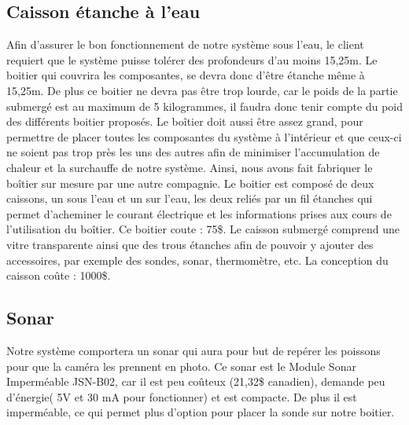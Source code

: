 	\subsection{Caisson étanche à l'eau}
	Afin d’assurer le bon fonctionnement de notre système sous l’eau, le client requiert que le système puisse tolérer des profondeurs d’au moins 15,25m. Le boitier qui couvrira les composantes, se devra donc d’être étanche même à 15,25m. De plus ce boitier ne devra pas être trop lourde, car le poids de la partie submergé est au maximum de 5 kilogrammes, il faudra donc tenir compte du poid des différents boitier proposés. Le boîtier doit aussi être assez grand, pour permettre de placer toutes les composantes du système à l’intérieur et que ceux-ci ne soient pas trop près les uns des autres afin de minimiser l’accumulation de chaleur et la surchauffe de notre système. Ainsi, nous avons fait fabriquer le boîtier sur mesure par une autre compagnie. Le boitier est composé de deux caissons, un sous l’eau et un sur l’eau, les deux reliés par un fil étanches qui permet d’acheminer le courant électrique et les informations prises aux cours de l’utilisation du boîtier. Ce boitier coute : 75\$. Le caisson submergé comprend une vitre transparente ainsi que des trous étanches afin de pouvoir y ajouter des accessoires, par exemple des sondes, sonar, thermomètre, etc. La conception du caisson coûte : 1000\$.
	
	\subsection{Sonar}
	Notre système comportera un sonar qui aura pour but de repérer les poissons pour que la caméra les prennent en photo. Ce sonar est le Module Sonar Imperméable JSN-B02\cite{sonarshop}, car il est peu coûteux (21,32\$ canadien), demande peu d’énergie( 5V et 30 mA pour fonctionner) et est compacte. De plus il est imperméable, ce qui permet plus d’option pour placer la sonde sur notre boitier.